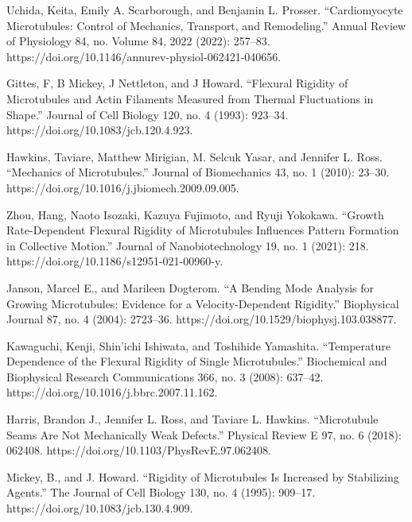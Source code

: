 \begin{thebibliography}{00}
Uchida, Keita, Emily A. Scarborough, and Benjamin L. Prosser. “Cardiomyocyte Microtubules: Control of Mechanics, Transport, and Remodeling.” Annual Review of Physiology 84, no. Volume 84, 2022 (2022): 257–83. https://doi.org/10.1146/annurev-physiol-062421-040656. %

Gittes, F, B Mickey, J Nettleton, and J Howard. “Flexural Rigidity of Microtubules and Actin Filaments Measured from Thermal Fluctuations in Shape.” Journal of Cell Biology 120, no. 4 (1993): 923–34. https://doi.org/10.1083/jcb.120.4.923.

Hawkins, Taviare, Matthew Mirigian, M. Selcuk Yasar, and Jennifer L. Ross. “Mechanics of Microtubules.” Journal of Biomechanics 43, no. 1 (2010): 23–30. https://doi.org/10.1016/j.jbiomech.2009.09.005. %

Zhou, Hang, Naoto Isozaki, Kazuya Fujimoto, and Ryuji Yokokawa. “Growth Rate-Dependent Flexural Rigidity of Microtubules Influences Pattern Formation in Collective Motion.” Journal of Nanobiotechnology 19, no. 1 (2021): 218. https://doi.org/10.1186/s12951-021-00960-y.

Janson, Marcel E., and Marileen Dogterom. “A Bending Mode Analysis for Growing Microtubules: Evidence for a Velocity-Dependent Rigidity.” Biophysical Journal 87, no. 4 (2004): 2723–36. https://doi.org/10.1529/biophysj.103.038877.

Kawaguchi, Kenji, Shin’ichi Ishiwata, and Toshihide Yamashita. “Temperature Dependence of the Flexural Rigidity of Single Microtubules.” Biochemical and Biophysical Research Communications 366, no. 3 (2008): 637–42. https://doi.org/10.1016/j.bbrc.2007.11.162.

Harris, Brandon J., Jennifer L. Ross, and Taviare L. Hawkins. “Microtubule Seams Are Not Mechanically Weak Defects.” Physical Review E 97, no. 6 (2018): 062408. https://doi.org/10.1103/PhysRevE.97.062408.

Mickey, B., and J. Howard. “Rigidity of Microtubules Is Increased by Stabilizing Agents.” The Journal of Cell Biology 130, no. 4 (1995): 909–17. https://doi.org/10.1083/jcb.130.4.909.


\end{thebibliography}
